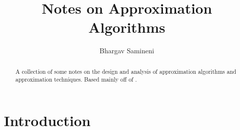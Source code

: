 \documentclass[11pt]{article}
\title{Notes on Approximation Algorithms}
\author{Bhargav Samineni}
\affil{}
\date{}
\begin{document}
    \maketitle  

    \begin{abstract}
        A collection of some notes on the design and analysis of approximation algorithms and approximation techniques. 
        Based mainly off of \cite{williamson2011design, vazirani2001approximation}. 
    \end{abstract}

    \section{Introduction}
    
    
    \newpage

 
\end{document}
